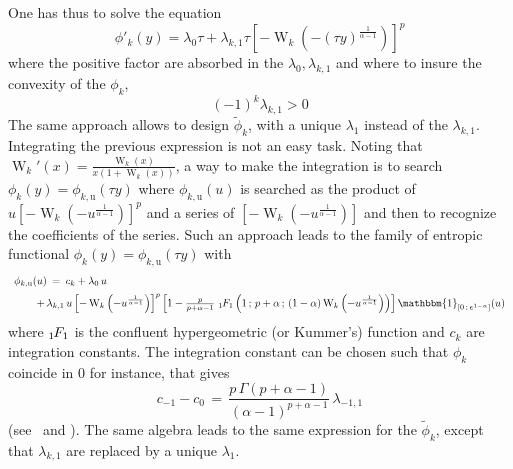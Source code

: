 \documentclass[english,sort&compress]{elsarticle}
\theoremstyle{definition}
\theoremstyle{plain}
\theoremstyle{plain}
\def\X{\mathcal{X}}
\def\un{\mathbbm{1}}
\def\W{\operatorname{W}}
\newcommand{\hypgeom}[2]{\mbox{}_{#1}\hspace{-1pt}F_{#2}}
\begin{document}
One has thus to solve the equation
%
\[
\phi'_k(y) =  \lambda_0 \tau  + \lambda_{k,1} \tau  \left[ - \W_k\left(  - (\tau
    y)^{\frac{1}{\alpha - 1}} \right) \right]^p
\]
%
where the  positive factor  are absorbed in  the $\lambda_0,  \lambda_{k,1}$ and
where to insure the convexity of the $\phi_k$,
%
\[
(-1)^k \lambda_{k,1} > 0
\]
%
The  same  approach  allows   to  design  $\widetilde{\phi}_k$,  with  a  unique
$\lambda_1$ instead of the $\lambda_{k,1}$.  Integrating the previous expression
is not an  easy task. Noting that $\W_k'(x)  = \frac{\W_k(x)}{x (1+\W_k(x))}$, a
way to make  the integration is to search  $\phi_k(y) = \phi_{k,\mathrm{u}}(\tau
y)$  where $\phi_{k,\mathrm{u}}(u)$  is searched  as the  product of  $u \left[-
  \W_k\left(  -  u^{\frac{1}{\alpha-1}} \right)  \right]^p  $  and  a series  of
$\left[  - \W_k\left(  -  u^{\frac{1}{\alpha-1}} \right)  \right]$  and then  to
recognize the coefficients  of the series. Such an approach  leads to the family
of entropic functional $\phi_k(y) = \phi_{k,\mathrm{u}}(\tau y)$ with
%
\[\begin{array}{l}
\phi_{k,\mathrm{u}}(u) \: = \: c_k + \lambda_0 \, u\\[2mm]
%
\hspace{7.5mm} + \, \lambda_{k,1} \, u \left[ - \W_k\left(
    -   u^{\frac{1}{\alpha-1}}   \right)  \right]^p   \left[   1  -
  \frac{p}{p+\alpha-1} \,  \, \hypgeom{1}{1}\left(  1 \, ;  \, p+\alpha \,  ; \,
    (1-\alpha)  \W_k   \left(  -  u^{\frac{1}{\alpha-1}}  \right)
  \right) \right] \un_{\left[ 0 \, ; \, e^{1-\alpha} \right]}(u)
\end{array}\]
%
where $\hypgeom{1}{1}$  is the  confluent hypergeometric (or  Kummer's) function
and  $c_k$ are  integration  constants. The integration constant
can be chosen such that $\phi_k$ coincide in 0 for instance, that gives
%
\[
c_{-1} - c_0 \,  = \, \frac{p \, \Gamma(p+\alpha-1)}{(\alpha-1)^{p+\alpha-1}} \,
\lambda_{-1,1}
\]
%
(see~\cite[eq.~13.1.4]{AbrSte70} and \cite[eq.]{CorGon96}).   The same algebra leads to
the same  expression for  the $\widetilde{\phi}_k$, except  that $\lambda_{k,1}$
are replaced by a unique $\lambda_1$.
\end{document}
